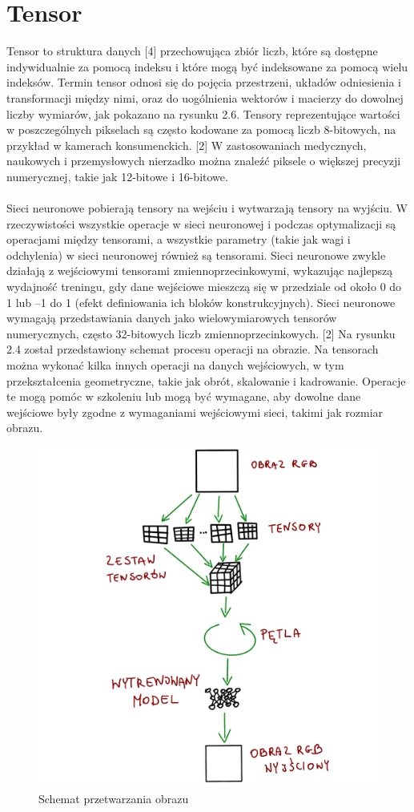 \documentclass[openright]{xmgr}
\begin{document}
\section{Tensor\label{s:dsssl}}


\indent \indent Tensor to struktura danych [4] przechowująca zbiór liczb, które są dostępne indywidualnie za pomocą indeksu i które mogą być indeksowane za pomocą wielu indeksów. Termin tensor odnosi się do pojęcia przestrzeni, układów odniesienia i transformacji między nimi, oraz do uogólnienia wektorów i macierzy do dowolnej liczby wymiarów, jak pokazano na rysunku 2.6.
Tensory reprezentujące wartości w poszczególnych pikselach są często kodowane za pomocą liczb 8-bitowych, na przykład w kamerach konsumenckich. [2] W zastosowaniach medycznych, naukowych i przemysłowych nierzadko można znaleźć piksele o większej precyzji numerycznej, takie jak 12-bitowe i 16-bitowe.
\\ 
\\
\indent \indent Sieci neuronowe pobierają tensory na wejściu i wytwarzają tensory na wyjściu. W rzeczywistości wszystkie operacje w sieci neuronowej i podczas optymalizacji są operacjami między tensorami, a wszystkie parametry (takie jak wagi i odchylenia) w sieci neuronowej również są tensorami. Sieci neuronowe zwykle działają z wejściowymi tensorami zmiennoprzecinkowymi, wykazując najlepszą wydajność treningu, gdy dane wejściowe mieszczą się w przedziale od około 0 do 1 lub –1 do 1 (efekt definiowania ich bloków konstrukcyjnych). Sieci neuronowe wymagają przedstawiania danych jako wielowymiarowych tensorów numerycznych, często 32-bitowych liczb zmiennoprzecinkowych. [2] Na rysunku 2.4 został przedstawiony schemat procesu operacji na obrazie. Na tensorach można  wykonać kilka innych operacji na danych wejściowych, w tym przekształcenia geometryczne, takie jak obrót, skalowanie i kadrowanie. Operacje te mogą pomóc w szkoleniu lub mogą być wymagane, aby dowolne dane wejściowe były zgodne z wymaganiami wejściowymi sieci, takimi jak rozmiar obrazu.

 \begin{figure}[!tbh]
\centering
\includegraphics[width=.8\hsize]{fig/5}
\caption{Schemat przetwarzania obrazu\label{RYS.5}}
\end{figure}
\clearpage
\end{document}
